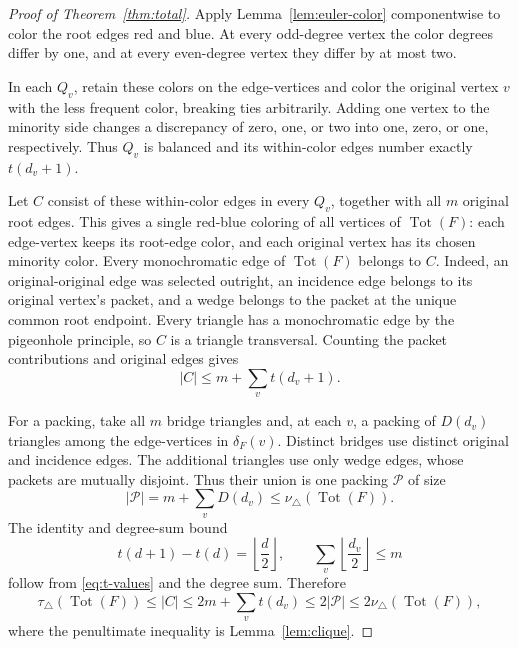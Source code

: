 \documentclass[11pt]{article}
\theoremstyle{remark}
\newcommand{\tri}{\triangle}
\newcommand{\Tot}{\operatorname{Tot}}
\begin{document}
\begin{proof}[Proof of Theorem~\ref{thm:total}]
Apply Lemma~\ref{lem:euler-color} componentwise to color the root edges red
and blue.  At every odd-degree vertex the color degrees differ by one, and
at every even-degree vertex they differ by at most two.

In each $Q_v$, retain these colors on the edge-vertices and color the original
vertex $v$ with the less frequent color, breaking ties arbitrarily.  Adding
one vertex to the minority side changes a discrepancy of zero, one, or two
into one, zero, or one, respectively.  Thus $Q_v$ is balanced and its
within-color edges number exactly $t(d_v+1)$.

Let $C$ consist of these within-color edges in every $Q_v$, together with
all $m$ original root edges.  This gives a single red-blue coloring of all
vertices of $\Tot(F)$: each edge-vertex keeps its root-edge color, and
each original vertex has its chosen minority color.  Every monochromatic
edge of $\Tot(F)$ belongs to $C$.  Indeed, an original-original edge was
selected outright, an incidence edge belongs to its original vertex's
packet, and a wedge belongs to the packet at the unique common root
endpoint.  Every triangle has a monochromatic edge by the pigeonhole
principle, so $C$ is a triangle transversal.  Counting the packet
contributions and original edges gives
\begin{equation}\label{eq:all-total-cover}
  |C|\leq m+\sum_v t(d_v+1).
\end{equation}

For a packing, take all $m$ bridge triangles and, at each $v$, a packing of
$D(d_v)$ triangles among the edge-vertices in $\delta_F(v)$.  Distinct bridges
use distinct original and incidence edges.  The additional triangles use
only wedge edges, whose packets are mutually disjoint.  Thus their union is
one packing $\mathcal P$ of size
\begin{equation}\label{eq:total-packing}
  |\mathcal P|=m+\sum_vD(d_v)\leq\nu_\tri(\Tot(F)).
\end{equation}
The identity and degree-sum bound
\begin{equation}\label{eq:parity-identities}
  t(d+1)-t(d)=\left\lfloor\frac d2\right\rfloor,
  \qquad
  \sum_v\left\lfloor\frac{d_v}{2}\right\rfloor\leq m
\end{equation}
follow from \eqref{eq:t-values} and the degree sum.  Therefore
\[
  \tau_\tri(\Tot(F))\leq |C|
  \leq 2m+\sum_vt(d_v)
  \leq 2|\mathcal P|
  \leq 2\nu_\tri(\Tot(F)),
\]
where the penultimate inequality is Lemma~\ref{lem:clique}.
\end{proof}
\end{document}
